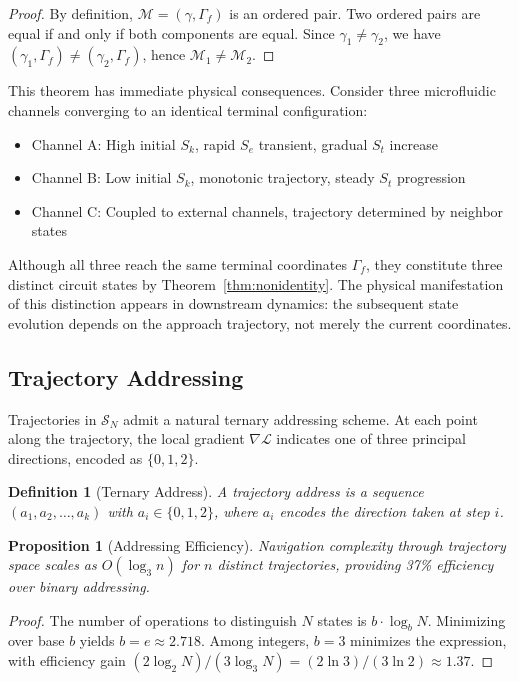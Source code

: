 \documentclass[aps,prl,twocolumn,superscriptaddress,showpacs]{revtex4-2}
\newtheorem{proposition}[theorem]{Proposition}
\newtheorem{definition}[theorem]{Definition}
\newcommand{\Sspace}{\mathcal{S}}
\newcommand{\Sk}{S_k}
\newcommand{\St}{S_t}
\newcommand{\Se}{S_e}
\newcommand{\traj}{\gamma}
\newcommand{\term}{\Gamma}
\begin{document}
\begin{proof}
By definition, $\mathcal{M} = (\traj, \term_f)$ is an ordered pair. Two ordered pairs are equal if and only if both components are equal. Since $\traj_1 \neq \traj_2$, we have $(\traj_1, \term_f) \neq (\traj_2, \term_f)$, hence $\mathcal{M}_1 \neq \mathcal{M}_2$.
\end{proof}

This theorem has immediate physical consequences. Consider three microfluidic channels converging to an identical terminal configuration:
\begin{itemize}
\item Channel A: High initial $\Sk$, rapid $\Se$ transient, gradual $\St$ increase
\item Channel B: Low initial $\Sk$, monotonic trajectory, steady $\St$ progression
\item Channel C: Coupled to external channels, trajectory determined by neighbor states
\end{itemize}

Although all three reach the same terminal coordinates $\term_f$, they constitute three distinct circuit states by Theorem~\ref{thm:nonidentity}. The physical manifestation of this distinction appears in downstream dynamics: the subsequent state evolution depends on the approach trajectory, not merely the current coordinates.

\subsection{Trajectory Addressing}

Trajectories in $\Sspace_N$ admit a natural ternary addressing scheme. At each point along the trajectory, the local gradient $\nabla \mathcal{L}$ indicates one of three principal directions, encoded as $\{0, 1, 2\}$.

\begin{definition}[Ternary Address]
A trajectory address is a sequence $(a_1, a_2, \ldots, a_k)$ with $a_i \in \{0, 1, 2\}$, where $a_i$ encodes the direction taken at step $i$.
\end{definition}

\begin{proposition}[Addressing Efficiency]
Navigation complexity through trajectory space scales as $O(\log_3 n)$ for $n$ distinct trajectories, providing 37\% efficiency over binary addressing.
\end{proposition}

\begin{proof}
The number of operations to distinguish $N$ states is $b \cdot \log_b N$. Minimizing over base $b$ yields $b = e \approx 2.718$. Among integers, $b = 3$ minimizes the expression, with efficiency gain $(2 \log_2 N) / (3 \log_3 N) = (2 \ln 3) / (3 \ln 2) \approx 1.37$.
\end{proof}
\end{document}
